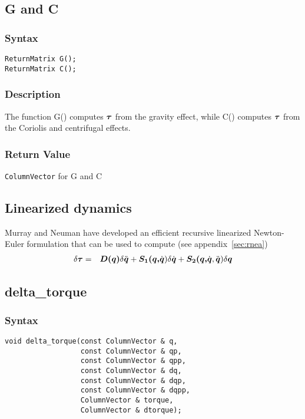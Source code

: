 \documentclass[11pt,fleqn,letterpaper]{report}
\newcommand{\mbold}[1]{\mbox{\boldmath $ #1 $}}
\begin{document}
\newpage

\subsection*{G and C}
\subsubsection*{Syntax}
\begin{verbatim}
ReturnMatrix G();
ReturnMatrix C();
\end{verbatim}
\subsubsection*{Description}
The function G() computes $\mbold{\tau}$ from the gravity effect,
while C() computes $\mbold{\tau}$ from the Coriolis and centrifugal
effects.

\subsubsection*{Return Value}

{\tt ColumnVector} for G and C

\newpage

\subsection{Linearized dynamics}
Murray and Neuman \cite{Murray86} have developed an efficient recursive linearized Newton-Euler formulation 
that can be used to compute (see appendix~\ref{sec:rnea})
\begin{eqnarray}
\delta \mbold{\tau} & = & \mbold{D(q)} \delta \ddot{\mbold{q}} 
+ \mbold{S_1(q,}\dot{\mbold{q}}) \delta \dot{\mbold{q}}
+ \mbold{S_2(q,}\dot{\mbold{q}},\ddot{\mbold{q}}) \delta \mbold{q}
\end{eqnarray}

\subsection*{delta\_torque}
\subsubsection*{Syntax}
\begin{verbatim}
void delta_torque(const ColumnVector & q, 
                  const ColumnVector & qp,
                  const ColumnVector & qpp, 
                  const ColumnVector & dq,
                  const ColumnVector & dqp, 
                  const ColumnVector & dqpp,
                  ColumnVector & torque, 
                  ColumnVector & dtorque);
\end{verbatim}
\end{document}
